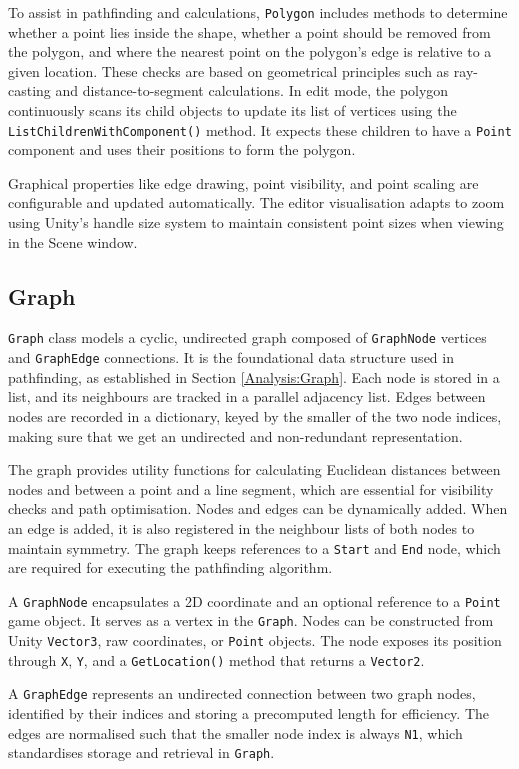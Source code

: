 To assist in pathfinding and calculations, \verb|Polygon| includes methods to determine whether a point lies inside the shape, whether a point should be removed from the polygon, and where the nearest point on the polygon's edge is relative to a given location. These checks are based on geometrical principles such as ray-casting and distance-to-segment calculations. In edit mode, the polygon continuously scans its child objects to update its list of vertices using the \verb|ListChildrenWithComponent()| method. It expects these children to have a \verb|Point| component and uses their positions to form the polygon.

Graphical properties like edge drawing, point visibility, and point scaling are configurable and updated automatically. The editor visualisation adapts to zoom using Unity’s handle size system to maintain consistent point sizes when viewing in the Scene window.


\subsection{Graph}
\verb|Graph| class models a cyclic, undirected graph composed of \verb|GraphNode| vertices and \verb|GraphEdge| connections. It is the foundational data structure used in pathfinding, as established in Section \ref{Analysis:Graph}. Each node is stored in a list, and its neighbours are tracked in a parallel adjacency list. Edges between nodes are recorded in a dictionary, keyed by the smaller of the two node indices, making sure that we get an undirected and non-redundant representation.

The graph provides utility functions for calculating Euclidean distances between nodes and between a point and a line segment, which are essential for visibility checks and path optimisation. Nodes and edges can be dynamically added. When an edge is added, it is also registered in the neighbour lists of both nodes to maintain symmetry. The graph keeps references to a \verb|Start| and \verb|End| node, which are required for executing the pathfinding algorithm.

 A \verb|GraphNode| encapsulates a 2D coordinate and an optional reference to a \verb|Point| game object. It serves as a vertex in the \verb|Graph|. Nodes can be constructed from Unity \verb|Vector3|, raw coordinates, or \verb|Point| objects. The node exposes its position through \verb|X|, \verb|Y|, and a \verb|GetLocation()| method that returns a \verb|Vector2|.

 A \verb|GraphEdge| represents an undirected connection between two graph nodes, identified by their indices and storing a precomputed length for efficiency. The edges are normalised such that the smaller node index is always \verb|N1|, which standardises storage and retrieval in \verb|Graph|.


